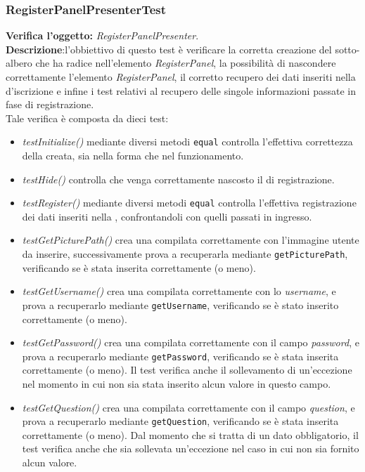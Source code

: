 \subsubsection{RegisterPanelPresenterTest}
\textbf{Verifica l'oggetto:} \textit{RegisterPanelPresenter}.\\
\textbf{Descrizione}:l'obbiettivo di questo test è verificare la corretta creazione del sotto-albero che ha radice nell'elemento \textit{RegisterPanel}, la possibilità di nascondere correttamente l'elemento \textit{RegisterPanel}, il corretto recupero dei dati inseriti nella  d'iscrizione e infine i test relativi al recupero delle singole informazioni passate in fase di registrazione.\\
Tale verifica è composta da dieci test:
\begin{itemize}
\item \textit{testInitialize() } mediante diversi metodi \texttt{equal} controlla l'effettiva correttezza della  creata, sia nella forma che nel funzionamento.
\item \textit{testHide() } controlla che venga correttamente nascosto il  di registrazione.
\item \textit{testRegister() } mediante diversi metodi \texttt{equal} controlla l'effettiva registrazione dei dati inseriti nella , confrontandoli con quelli passati in ingresso.
\item \textit{testGetPicturePath()} crea una  compilata correttamente con l'immagine utente da inserire, successivamente prova a recuperarla mediante \texttt{getPicturePath}, verificando se è stata inserita correttamente (o meno).
\item \textit{testGetUsername() } crea una  compilata correttamente con lo \textit{username}, e prova a recuperarlo mediante \texttt{getUsername}, verificando se è stato inserito correttamente (o meno).
\item \textit{testGetPassword()} crea una  compilata correttamente con il campo \textit{password}, e prova a recuperarlo mediante \texttt{getPassword}, verificando se è stata inserita correttamente (o meno). Il test verifica anche il sollevamento di un'eccezione nel momento in cui non sia stata inserito alcun valore in questo campo.
\item \textit{testGetQuestion()}  crea una  compilata correttamente con il campo \textit{question}, e prova a recuperarlo mediante \texttt{getQuestion}, verificando se è stata inserita correttamente (o meno). Dal momento che si tratta di un dato obbligatorio, il test verifica anche che sia sollevata un'eccezione nel caso in cui non sia fornito alcun valore.

\end{itemize}
